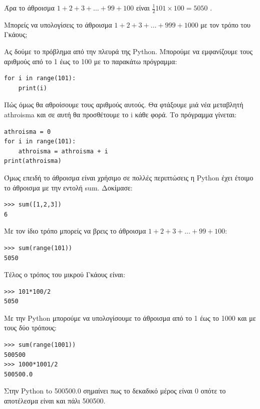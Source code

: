 \documentclass[b5paper,11pt,twoside,openleft]{memoir}
\begin{document}
Άρα το άθροισμα $1 + 2 + 3+ \ldots + 99 + 100$ είναι $\frac{1}{2}101\times 100 = 5050$ .

Μπορείς να υπολογίσεις το άθροισμα $1 + 2 + 3+ \ldots + 999 + 1000$ με τον τρόπο του Γκάους;

Ας δούμε το πρόβλημα από την πλευρά της Python.
Μπορούμε να εμφανίζουμε τους αριθμούς από το 1 έως το 100 με το παρακάτω πρόγραμμα:
\begin{lstlisting}
for i in range(101):
    print(i)
\end{lstlisting}
Πώς όμως θα αθροίσουμε τους αριθμούς αυτούς. Θα φτάξουμε μιά νέα μεταβλητή athroisma και σε αυτή θα προσθέτουμε το i κάθε φορά. Το πρόγραμμα γίνεται:

\begin{lstlisting}
athroisma = 0
for i in range(101):
    athroisma = athroisma + i
print(athroisma)
\end{lstlisting}

Όμως επειδή το άθροισμα είναι χρήσιμο σε πολλές περιπτώσεις η Python έχει έτοιμο το άθροισμα με την εντολή sum. Δοκίμασε:
\begin{lstlisting}
>>> sum([1,2,3])
6
\end{lstlisting}

Με τον ίδιο τρόπο μπορείς να βρεις το άθροισμα $1 + 2 + 3+ \ldots + 99 + 100$:
\begin{lstlisting}
>>> sum(range(101))
5050
\end{lstlisting}

Τέλος ο τρόπος του μικρού Γκάους είναι:
\begin{lstlisting}
>>> 101*100/2
5050
\end{lstlisting}

Με την Python μπορούμε να υπολογίσουμε το άθροισμα από το 1 έως το 1000 και με τους δύο τρόπους:
\begin{lstlisting}
>>> sum(range(1001))
500500
>>> 1000*1001/2
500500.0
\end{lstlisting}
Στην Python to 500500.0 σημαίνει πως το δεκαδικό μέρος είναι 0 οπότε το αποτέλεσμα είναι και πάλι 500500.



%
%
%
%
%
%
%
%
\end{document}
